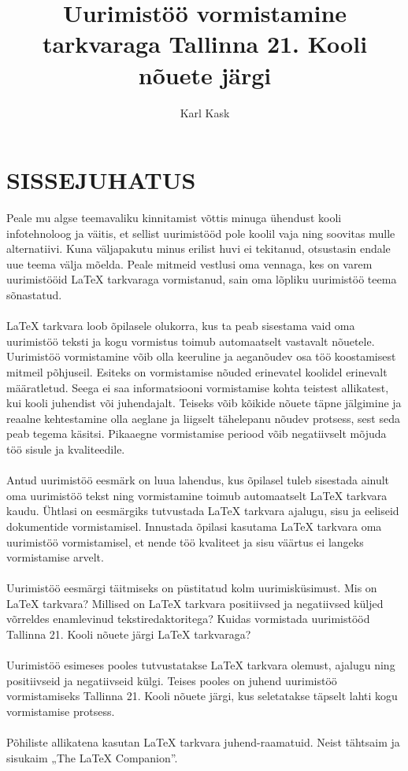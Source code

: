 \documentclass{21kuur}
\title{Uurimistöö vormistamine \latex tarkvaraga Tallinna 21. Kooli nõuete järgi}
\author{Karl Kask}
\begin{document}
\maketitle
\tableofcontents

\chapter*{SISSEJUHATUS}
Peale mu algse teemavaliku kinnitamist võttis minuga ühendust kooli infotehnoloog ja väitis, et sellist uurimistööd pole koolil vaja ning soovitas mulle alternatiivi. Kuna väljapakutu minus erilist huvi ei tekitanud, otsustasin endale uue teema välja mõelda. Peale mitmeid vestlusi oma vennaga, kes on varem uurimistööid LaTeX tarkvaraga vormistanud, sain oma lõpliku uurimistöö teema sõnastatud.
\\\\LaTeX tarkvara loob õpilasele olukorra, kus ta peab sisestama vaid oma uurimistöö teksti ja kogu vormistus toimub automaatselt vastavalt nõuetele. Uurimistöö vormistamine võib olla keeruline ja aeganõudev osa töö koostamisest mitmeil põhjuseil. Esiteks on vormistamise nõuded erinevatel koolidel erinevalt määratletud. Seega ei saa informatsiooni vormistamise kohta teistest allikatest, kui kooli juhendist või juhendajalt. Teiseks võib kõikide nõuete täpne jälgimine ja reaalne kehtestamine olla aeglane ja liigselt tähelepanu nõudev protsess, sest seda peab tegema käsitsi. Pikaaegne vormistamise periood võib negatiivselt mõjuda töö sisule ja kvaliteedile.
\\\\Antud uurimistöö eesmärk on luua lahendus, kus õpilasel tuleb sisestada ainult oma uurimistöö tekst ning vormistamine toimub automaatselt LaTeX tarkvara kaudu. Ühtlasi on eesmärgiks tutvustada LaTeX tarkvara ajalugu, sisu ja eeliseid dokumentide vormistamisel. Innustada õpilasi kasutama LaTeX tarkvara oma uurimistöö vormistamisel, et nende töö kvaliteet ja sisu väärtus ei langeks vormistamise arvelt. 
\\\\Uurimistöö eesmärgi täitmiseks on püstitatud kolm uurimisküsimust. Mis on LaTeX tarkvara? Millised on LaTeX tarkvara positiivsed ja negatiivsed küljed võrreldes enamlevinud tekstiredaktoritega? Kuidas vormistada uurimistööd Tallinna 21. Kooli nõuete järgi LaTeX tarkvaraga?
\\\\Uurimistöö esimeses pooles tutvustatakse LaTeX tarkvara olemust, ajalugu ning positiivseid ja negatiivseid külgi. Teises pooles on juhend uurimistöö vormistamiseks Tallinna 21. Kooli nõuete järgi, kus seletatakse täpselt lahti kogu vormistamise protsess.
\\\\Põhiliste allikatena kasutan LaTeX tarkvara juhend-raamatuid. Neist tähtsaim ja sisukaim „The LaTeX Companion”.
\end{document}
